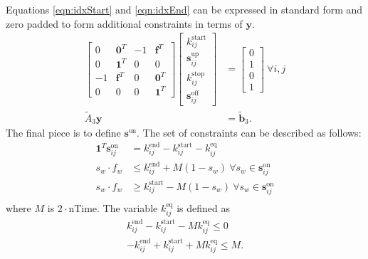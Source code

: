Equations \ref{eqn:idxStart} and \ref{eqn:idxEnd} can be expressed in standard form and zero padded to form additional constraints in terms of $\mathbf{y}$.
\begin{equation} \begin{aligned}
	\begin{bmatrix} 0 & \mathbf{0}^T & -1 & \mathbf{f}^T \\
		        0 & \mathbf{1}^T &  0 & 0            \\
		       -1 & \mathbf{f}^T & 0 & \mathbf{0}^T  \\
		        0 & 0            & 0 & \mathbf{1}^T 
	\end{bmatrix} 
	\begin{bmatrix} k_{ij}^{\text{start}}       \\
		        \mathbf{s}_{ij}^{\text{up}} \\ 
			k_{ij}^{\text{stop}}        \\ 
			\mathbf{s}_{ij}^{\text{off}} 
	\end{bmatrix} &= 
	\begin{bmatrix} 0 \\ 
			1 \\
	                0 \\
			1
	\end{bmatrix} \ \forall i,j \\
	\tilde{A}_3\mathbf{y} &= \tilde{\mathbf{b}}_3.
\end{aligned} \end{equation}
The final piece is to define $\mathbf{s}^{\text{on}}$. The set of constraints can be described as follows: 
\begin{equation} \label{eqn:idxMiddle}\begin{aligned}
	\mathbf{1}^T\mathbf{s}^{\text{on}}_{ij} &= k^{\text{end}}_{ij} - k^{\text{start}}_{ij} - k_{ij}^{\text{eq}} \\
	s_w\cdot f_w &\le k^{\text{end}}_{ij} + M(1 - s_w) \ \forall s_w \in \mathbf{s}^{\text{on}}_{ij}\\
	s_w\cdot f_w &\ge k^{\text{start}}_{ij} - M(1 - s_w) \ \forall s_w \in \mathbf{s}^{\text{on}}_{ij}\\ 
\end{aligned} \end{equation}
where $M$ is $2\cdot\text{nTime}$. The variable $k_{ij}^{\text{eq}}$ is defined as
\begin{equation}\begin{aligned}
	k_{ij}^{\text{end}} - k_{ij}^{\text{start}} - M k_{ij}^{\text{eq}} \le 0 \\
	-k_{ij}^{\text{end}} + k_{ij}^{\text{start}} + M k_{ij}^{\text{eq}} \le M .
\end{aligned}\end{equation}
